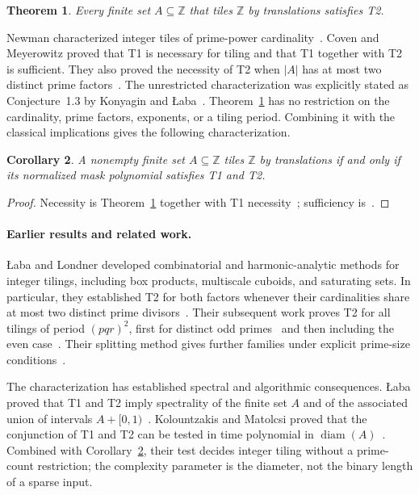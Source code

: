 \documentclass[11pt]{article}
\newtheorem{theorem}{Theorem}
\newtheorem{corollary}[theorem]{Corollary}
\newcommand{\Z}{\mathbb Z}
\begin{document}
\begin{theorem}\label{thm:integer}
Every finite set $A\subseteq\Z$ that tiles $\Z$ by translations satisfies T2.
\end{theorem}

Newman characterized integer tiles of prime-power cardinality~\cite{Newman}. Coven and Meyerowitz proved that T1 is necessary for tiling and that T1 together with T2 is sufficient. They also proved the necessity of T2 when $|A|$ has at most two distinct prime factors~\cite[Theorems A, B1, and B2]{CM}. The unrestricted characterization was explicitly stated as Conjecture~1.3 by Konyagin and \L aba~\cite{KonyaginLaba}. Theorem~\ref{thm:integer} has no restriction on the cardinality, prime factors, exponents, or a tiling period. Combining it with the classical implications gives the following characterization.

\begin{corollary}\label{cor:characterization}
A nonempty finite set $A\subseteq\Z$ tiles $\Z$ by translations if and only if its normalized mask polynomial satisfies T1 and T2.
\end{corollary}
\begin{proof}
Necessity is Theorem~\ref{thm:integer} together with T1 necessity~\cite[Theorem B1]{CM}; sufficiency is~\cite[Theorem A]{CM}.
\end{proof}

\paragraph{Earlier results and related work.}
\L aba and Londner developed combinatorial and harmonic-analytic methods for integer tilings, including box products, multiscale cuboids, and saturating sets. In particular, they established T2 for both factors whenever their cardinalities share at most two distinct prime divisors~\cite[Corollary~6.2]{LLMethods}. Their subsequent work proves T2 for all tilings of period $(pqr)^2$, first for distinct odd primes~\cite{LLOdd} and then including the even case~\cite{LLEven}. Their splitting method gives further families under explicit prime-size conditions~\cite[Theorem~1.2 and Corollary~1.5]{LL}.

The characterization has established spectral and algorithmic consequences. \L aba proved that T1 and T2 imply spectrality of the finite set $A$ and of the associated union of intervals $A+[0,1)$~\cite[Theorem~1.5(i) and Proposition~1.3]{LabaSpectral}. Kolountzakis and Matolcsi proved that the conjunction of T1 and T2 can be tested in time polynomial in $\operatorname{diam}(A)$~\cite[Theorem~2.1]{KMAlgorithms}. Combined with Corollary~\ref{cor:characterization}, their test decides integer tiling without a prime-count restriction; the complexity parameter is the diameter, not the binary length of a sparse input.
\end{document}
